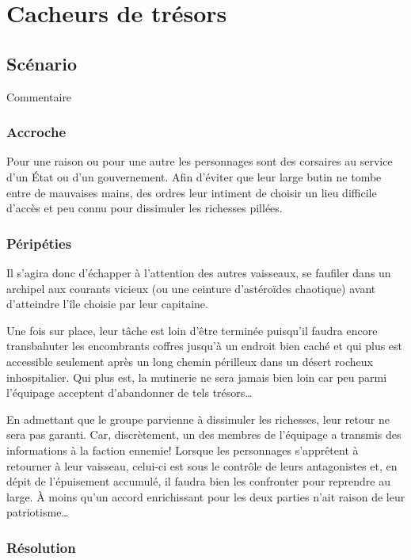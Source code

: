 \chapter{Cacheurs de trésors}

\section{Scénario}

Commentaire

\subsection{Accroche}

Pour une raison ou pour une autre les personnages sont des corsaires au service d'un État ou d'un gouvernement.
Afin d'éviter que leur large butin ne tombe entre de mauvaises mains, des ordres leur intiment de choisir un lieu difficile d'accès et peu connu pour dissimuler les richesses pillées.

\subsection{Péripéties}

Il s'agira donc d'échapper à l'attention des autres vaisseaux, se faufiler dans un archipel aux courants vicieux (ou une ceinture d'astéroïdes chaotique) avant d'atteindre l'île choisie par leur capitaine.

Une fois sur place, leur tâche est loin d'être terminée puisqu'il faudra encore transbahuter les encombrants coffres jusqu'à un endroit bien caché et qui plus est accessible seulement après un long chemin périlleux dans un désert rocheux inhospitalier.
Qui plus est, la mutinerie ne sera jamais bien loin car peu parmi l'équipage acceptent d'abandonner de tels trésors\dots

En admettant que le groupe parvienne à dissimuler les richesses, leur retour ne sera pas garanti.
Car, discrètement, un des membres de l'équipage a transmis des informations à la faction ennemie!
Lorsque les personnages s'apprêtent à retourner à leur vaisseau, celui-ci est sous le contrôle de leurs antagonistes et, en dépit de l'épuisement accumulé, il faudra bien les confronter pour reprendre au large.
À moins qu'un accord enrichissant pour les deux parties n'ait raison de leur patriotisme\dots

\subsection{Résolution}
